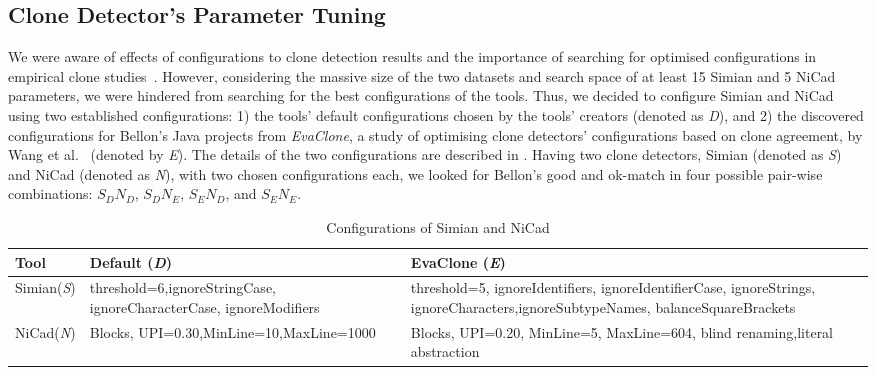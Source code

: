 \documentclass[sigconf,review, anonymous]{acmart}
\begin{document}
\subsection{Clone Detector's Parameter Tuning}
We were aware of effects of configurations to clone detection results and the importance of searching for optimised configurations in empirical clone studies~\cite{Wang2014,cr2016ssbse,Ragkhitwetsagul2016,Svajlenko2014}. However, considering the massive size of the two datasets and search space of at least 15 Simian and 5 NiCad parameters, we were hindered from searching for the best configurations of the tools. Thus, we decided to configure Simian and NiCad using two established configurations: 1) the tools' default configurations chosen by the tools' creators (denoted as \textit{D}), and 2) the discovered configurations for Bellon's Java projects from \textit{EvaClone}, a study of optimising clone detectors' configurations based on clone agreement, by Wang et al.~\cite{Wang2013} (denoted by \textit{E}). The details of the two configurations are described in . Having two clone detectors, Simian (denoted as \textit{S}) and NiCad (denoted as \textit{N}), with two chosen configurations each, we looked for Bellon's good and ok-match in four possible pair-wise combinations: $S_{D}N_{D}$, $S_{D}N_{E}$, $S_{E}N_{D}$, and $S_{E}N_{E}$.

\begin{table}
	\centering
	\caption{Configurations of Simian and NiCad}
	\label{t:param_tuning}
	\small
	\begin{tabular}{p{0.7cm}|p{2.4cm}|p{3.5cm}}
		\hline 
		Tool & Default (\textit{D}) & EvaClone (\textit{E}) \\
		\hline
		Simian\newline (\textit{S}) &  threshold=6,\newline ignoreStringCase, \newline ignoreCharacterCase, \newline ignoreModifiers & threshold=5, ignoreIdentifiers, \newline ignoreIdentifierCase, \newline ignoreStrings, \newline ignoreCharacters,\newline ignoreSubtypeNames, \newline balanceSquareBrackets \\ 
		\hline 
		NiCad\newline (\textit{N}) & Blocks, UPI=0.30,\newline MinLine=10,\newline MaxLine=1000 & Blocks, UPI=0.20, \newline MinLine=5, MaxLine=604, \newline blind renaming,\newline literal abstraction \\
		\hline
	\end{tabular} %
\end{table}
\end{document}
